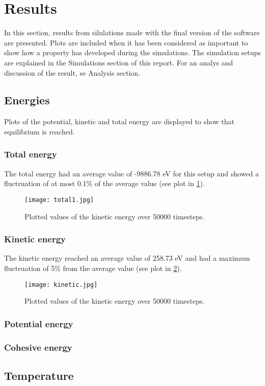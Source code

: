 \section{Results}
In this section, results from silulations made with the final version of the software are presented. Plots are included when it has been considered as important to show how a property has developed during the simulations. The simulation setups are explained in the Simulations section of this report. For an analys and discussion of the result, se Analysis section.
\subsection{Energies}
Plots of the potential, kinetic and total energy are displayed to show that equilibrium is reached. 
\subsubsection{Total energy}
The total energy had an average value of -9886.78 eV for this setup and showed a fluctruation of at most 0.1\% of the average value (see plot in \ref{totale}).
\begin{figure}[h]
	\centering
	\texttt{[image: total1.jpg]}
	\caption{Plotted values of the kinetic energy over 50000 timesteps.}
	\label{totale}
\end{figure}

\subsubsection{Kinetic energy}
The kinetic energy reached an average value of 258.73 eV and had a maximum fluctruation of 5\% from the average value (see plot in \ref{kinetic}).
\begin{figure}[h]
	\centering
	\texttt{[image: kinetic.jpg]}
	\caption{Plotted values of the kinetic energy over 50000 timesteps.}
	\label{kinetic}
\end{figure}

\subsubsection{Potential energy}
\subsubsection{Cohesive energy}
\subsection{Temperature}
